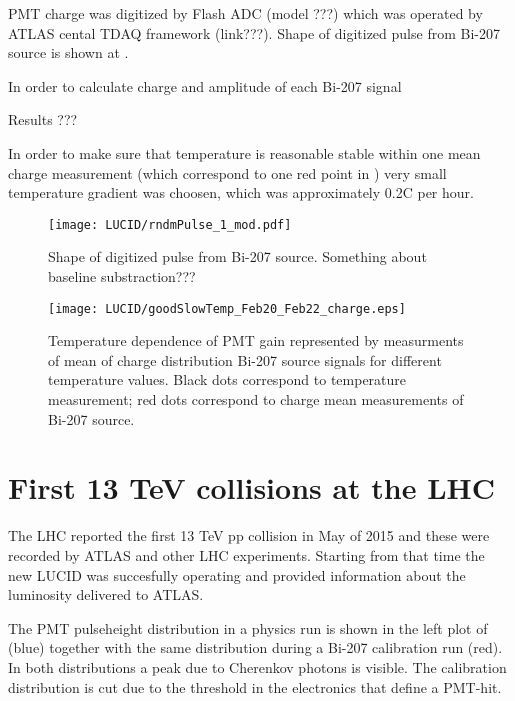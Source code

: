 PMT charge was digitized by Flash ADC (model ???) which was operated by ATLAS cental TDAQ framework (link???).
Shape of digitized pulse from Bi-207 source is shown at . 

In order to calculate charge and amplitude of each Bi-207 signal 

Results ???

In order to make sure that temperature is reasonable stable within one mean charge measurement (which correspond to one red point in ) 
very small temperature gradient was choosen, which was approximately 0.2\degree C per hour. 


\begin{figure}
\centering
\texttt{[image: LUCID/rndmPulse\_1\_mod.pdf]}
\caption{Shape of digitized pulse from Bi-207 source. Something about baseline substraction??? }
\label{fig:bi207DigitizedPulse}
\end{figure}


\begin{figure}
\centering
\texttt{[image: LUCID/goodSlowTemp\_Feb20\_Feb22\_charge.eps]}
\caption{Temperature dependence of PMT gain represented by measurments of mean of charge distribution Bi-207 source signals for different temperature values.
Black dots correspond to temperature measurement; red dots correspond to charge mean measurements of Bi-207 source.}
\label{fig:PMTChargeTempDep}
\end{figure}


\section{First 13 TeV collisions at the LHC}
\label{sec:physics}

The LHC reported the first 13 TeV pp collision in May of 2015 and these were recorded by ATLAS and other LHC 
experiments. 
Starting from that time the new LUCID was succesfully operating and provided information about the 
luminosity delivered to ATLAS. 

The PMT pulseheight distribution in a physics run is shown in the left plot of  (blue) 
together with the same distribution 
during a Bi-207 calibration run (red). In both distributions a peak due to Cherenkov photons is visible. The 
calibration distribution is cut due to the threshold in the electronics that define a PMT-hit.


